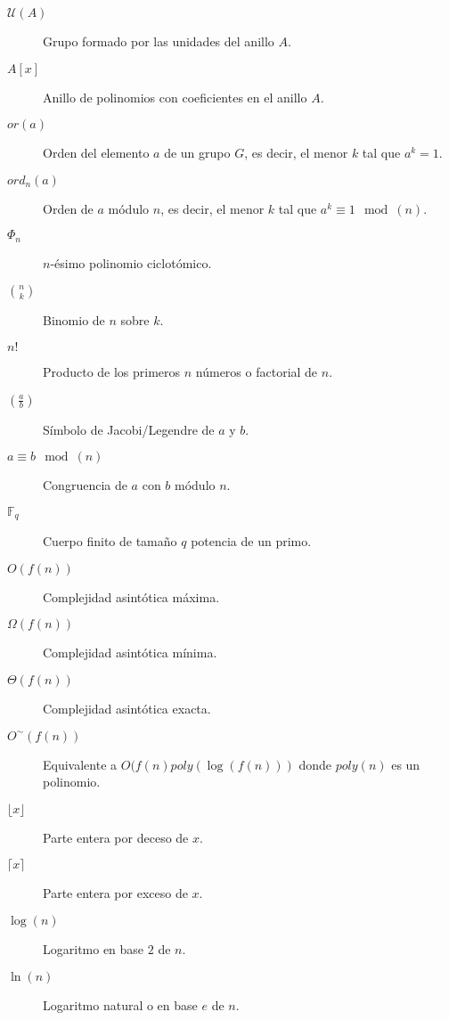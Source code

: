 \begin{description}
	\item[$\mathcal{U}(A)$] Grupo formado por las unidades del anillo $A$.
	
	\item[${A[x]}$] Anillo de polinomios con coeficientes en el anillo $A$.
	
	\item[$or(a)$] Orden del elemento $a$ de un grupo $G$, es decir, el menor $k$ tal que $a^k = 1$.
	
	\item[$ord_n(a)$] Orden de $a$ módulo $n$, es decir, el menor $k$ tal que $a^k \equiv 1 \mod(n)$.
	
	\item[$\Phi_n$] $n$-ésimo polinomio ciclotómico.
	
	\item[$\binom{n}{k}$] Binomio de $n$ sobre $k$.
	
	\item[$n!$] Producto de los primeros $n$ números o factorial de $n$.
	
	\item[$\left(\frac{a}{b}\right)$] Símbolo de Jacobi/Legendre de $a$ y $b$.
	
	\item[$a \equiv b \mod(n)$] Congruencia de $a$ con $b$ módulo $n$.
	
	\item[$\mathbb{F}_q$] Cuerpo finito de tamaño $q$ potencia de un primo.
	
	\item[$O(f(n))$] Complejidad asintótica máxima.
	
	\item[$\Omega(f(n))$] Complejidad asintótica mínima.
	
	\item[$\Theta(f(n))$] Complejidad asintótica exacta.
	
	\item[$O^\sim(f(n))$] Equivalente a $O(f(n)poly(\log(f(n)))$ donde $poly(n)$ es un polinomio.
	
	\item[$\lfloor x \rfloor$] Parte entera por deceso de $x$.
	
	\item[$\lceil x \rceil$] Parte entera por exceso de $x$.
	
	\item[$\log(n)$] Logaritmo en base $2$ de $n$.
	
	\item[$\ln(n)$] Logaritmo natural o en base $e$ de $n$.
	

\end{description}
